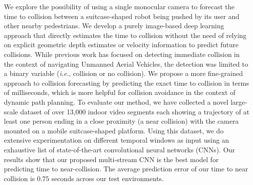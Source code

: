 We explore the possibility of using a single monocular camera to forecast the time to collision between a suitcase-shaped robot being pushed by its user and other nearby pedestrians. We develop a purely image-based deep learning approach that directly estimates the time to collision without the need of relying on explicit geometric depth estimates or velocity information to predict future collisions. While previous work has focused on detecting immediate collision in the context of navigating Unmanned Aerial Vehicles, the detection was limited to a binary variable (\emph{i.e.}, collision or no collision). We propose a more fine-grained approach to collision forecasting by predicting the exact time to collision in terms of milliseconds, which is more helpful for collision avoidance in the context of dynamic path planning. To evaluate our method, we have collected a novel large-scale dataset of over 13,000 indoor video segments each showing a trajectory of at least one person ending in a close proximity (a near collision) with the camera mounted on a mobile suitcase-shaped platform. Using this dataset, we do extensive experimentation on different temporal windows as input using an exhaustive list of state-of-the-art convolutional neural networks (CNNs). Our results show that our proposed multi-stream CNN is the best model for predicting time to near-collision. The average prediction error of our time to near collision is $0.75$ seconds across our test environments.
